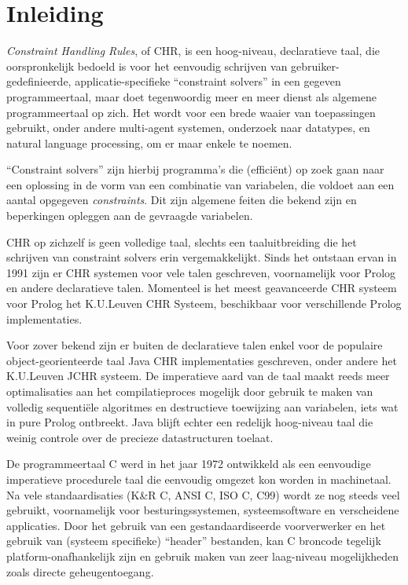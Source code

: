\chapter{Inleiding}
\label{chap:inleiding}

{\em Constraint Handling Rules}, of CHR, is een hoog-niveau, declaratieve taal, die oorspronkelijk bedoeld is voor het eenvoudig schrijven van gebruiker-gedefinieerde, applicatie-specifieke ``constraint solvers'' in een gegeven programmeertaal, maar doet tegenwoordig meer en meer dienst als algemene programmeertaal op zich. Het wordt voor een brede waaier van toepassingen gebruikt, onder andere multi-agent systemen, onderzoek naar datatypes, en natural language processing, om er maar enkele te noemen.

``Constraint solvers'' zijn hierbij programma's die (effici\"ent) op zoek gaan naar een oplossing in de vorm van een combinatie van variabelen, die voldoet aan een aantal opgegeven {\em constraints}. Dit zijn algemene feiten die bekend zijn en beperkingen opleggen aan de gevraagde variabelen.

CHR op zichzelf is geen volledige taal, slechts een taaluitbreiding die het schrijven van constraint solvers erin vergemakkelijkt. Sinds het ontstaan ervan in 1991 zijn er CHR systemen voor vele talen geschreven, voornamelijk voor Prolog en andere declaratieve talen. Momenteel is het meest geavanceerde CHR systeem voor Prolog het K.U.Leuven CHR Systeem, beschikbaar voor verschillende Prolog implementaties. 

Voor zover bekend zijn er buiten de declaratieve talen enkel voor de populaire object-georienteerde taal Java CHR implementaties geschreven, onder andere het K.U.Leuven JCHR systeem. De imperatieve aard van de taal maakt reeds meer optimalisaties aan het compilatieproces mogelijk door gebruik te maken van volledig sequenti\"ele algoritmes en destructieve toewijzing aan variabelen, iets wat in pure Prolog ontbreekt. Java blijft echter een redelijk hoog-niveau taal die weinig controle over de precieze datastructuren toelaat.

De programmeertaal C werd in het jaar 1972 ontwikkeld als een eenvoudige imperatieve procedurele taal die eenvoudig omgezet kon worden in machinetaal. Na vele standaardisaties (K\&R C, ANSI C, ISO C, C99) wordt ze nog steeds veel gebruikt, voornamelijk voor besturingssystemen, systeemsoftware en verscheidene applicaties. Door het gebruik van een gestandaardiseerde voorverwerker en het gebruik van (systeem specifieke) ``header'' bestanden, kan C broncode tegelijk platform-onafhankelijk zijn en gebruik maken van zeer laag-niveau mogelijkheden zoals directe geheugentoegang.

